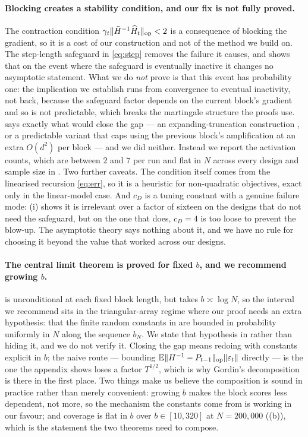 \paragraph{Blocking creates a stability condition, and our fix is not fully proved.}
The contraction condition $\gamma_t\lVert \bar{H}^{-1}\widehat H_t \rVert_{\mathrm{op}}<2$ is a consequence of blocking the
gradient, so it is a cost of our construction and not of the method we build on. The step-length
safeguard in \eqref{eq:step} removes the failure it causes, and  shows that on
the event where the safeguard is eventually inactive it changes no asymptotic statement. What we
do \emph{not} prove is that this event has probability one: the implication we establish runs
from convergence to eventual inactivity, not back, because the safeguard factor depends on the
current block's gradient and so is not predictable, which breaks the martingale structure the
proofs use.  says exactly what would close the gap --- an expanding-truncation
construction \citep{kushner2003stochastic,andrieu2005stability}, or a predictable variant that
caps using the previous block's amplification at an extra $O(d^2)$ per block --- and we did
neither. Instead we report the activation counts, which are between $2$ and $7$ per run and flat
in $N$ across every design and sample size in . Two further caveats.
The condition itself comes from the linearised recursion \eqref{eq:err}, so it is a heuristic for
non-quadratic objectives, exact only in the linear-model case. And $c_D$ is a tuning constant with a genuine failure mode:
(i) shows it is irrelevant over a factor of sixteen on the designs that do not
need the safeguard, but on the one that does, $c_D=4$ is too loose to prevent the blow-up. The
asymptotic theory says nothing about it, and we have no rule for choosing it beyond the value that
worked across our designs.

\paragraph{The central limit theorem is proved for fixed $b$, and we recommend growing $b$.}
 is unconditional at each fixed block length, but  takes
$b\asymp\log N$, so the interval we recommend sits in the triangular-array regime where our proof
needs an extra hypothesis: that the finite random constants in  are bounded in
probability uniformly in $N$ along the sequence $b_N$. We state that hypothesis in
 rather than hiding it, and we do not verify it. Closing the gap means redoing
 with constants explicit in $b$; the naive route --- bounding
$\mathbb{E}\lVert H^{-1}-P_{t-1} \rVert_{\mathrm{op}}\lVert \varepsilon_t \rVert$ directly --- is the one the appendix shows loses a factor
$T^{1/2}$, which is why Gordin's decomposition is there in the first place. Two things make us
believe the composition is sound in practice rather than merely convenient: growing $b$ makes the
block scores less dependent, not more, so the mechanism the constants come from is working in our
favour; and coverage is flat in $b$ over $b\in[10,320]$ at $N=200{,}000$
((b)), which is the statement the two theorems need to compose.

